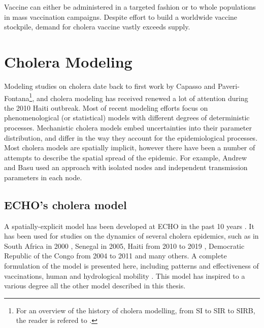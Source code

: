  Vaccine can either be administered in a targeted fashion or to whole populations in mass vaccination campaigns. Despite effort to build a worldwide vaccine stockpile, demand for cholera vaccine vastly exceeds supply\cite[-1\baselineskip]{Parker:AdaptingGlobalShortage:2017a,Seidlein:PreventingCholeraOutbreaks:2018}.


\section{Cholera Modeling}

Modeling studies on cholera date back to first work by Capasso and Paveri-Fontana\cite{Capasso:MathematicalModel1973:1979}\footnote{For an overview of the history of cholera modelling, from SI to SIR to SIRB, the reader is refered to .}, and cholera modeling has received renewed a lot of attention during the 2010 Haiti outbreak. Most of recent modeling efforts focus on phenomenological (or statistical) models with different degrees of deterministic processes. Mechanistic cholera models embed uncertainties into their parameter distribution, and differ in the way they account for the epidemiological processes. Most cholera models are spatially implicit, however there have been a number of attempts to describe the spatial spread of the epidemic. For example, Andrew and Basu used an approach with isolated nodes and independent transmission parameters in each node.

\subsection{ECHO's cholera model}
A spatially-explicit model has been developed at ECHO in the past 10 years \parencite{Bertuzzo:SpacetimeEvolutionCholera:2008}. It has been used for studies on the dynamics of several cholera epidemics, such as in South Africa in 2000 \parencite{Mari:ModellingCholeraEpidemics:2012}, Senegal in 2005, Haiti from 2010 to 2019 \parencite{Bertuzzo:PredictionSpatialEvolution:2011,Bertuzzo:ProbabilityExtinctionHaiti:2016}, Democratic Republic of the Congo from 2004 to 2011 and many others\cite{Finger:PotentialImpactCasearea:2018}.  
A complete formulation of the model is presented here, including patterns and effectiveness of vaccinations, human and hydrological mobility \parencite{Bertuzzo:ProbabilityExtinctionHaiti:2016,Pasetto:RealtimeForecastingCholera:2018}. This model has inspired to a various degree all the other model described in this thesis.


